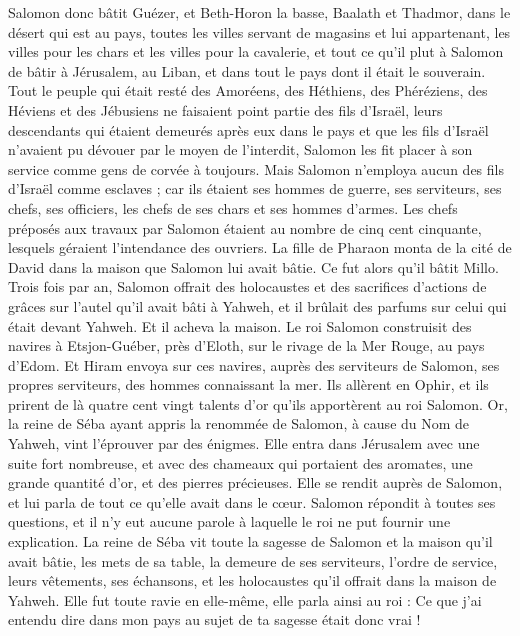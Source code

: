 \begin{multicols}{2}
Salomon donc bâtit Guézer, et Beth-Horon la basse,
Baalath et Thadmor, dans le désert qui est au pays,
toutes les villes servant de magasins et lui appartenant, les villes pour les chars et les villes pour la cavalerie, et tout ce qu’il plut à Salomon de bâtir à Jérusalem, au Liban, et dans tout le pays dont il était le souverain.
Tout le peuple qui était resté des Amoréens, des Héthiens, des Phéréziens, des Héviens et des Jébusiens ne faisaient point partie des fils d'Israël,
leurs descendants qui étaient demeurés après eux dans le pays et que les fils d'Israël n'avaient pu dévouer par le moyen de l'interdit, Salomon les fit placer à son service comme gens de corvée à toujours.
Mais Salomon n’employa aucun des fils d'Israël comme esclaves ; car ils étaient ses hommes de guerre, ses serviteurs, ses chefs, ses officiers, les chefs de ses chars et ses hommes d'armes.
Les chefs préposés aux travaux par Salomon étaient au nombre de cinq cent cinquante, lesquels géraient l'intendance des ouvriers.
La fille de Pharaon monta de la cité de David dans la maison que Salomon lui avait bâtie. Ce fut alors qu’il bâtit Millo.
Trois fois par an, Salomon offrait des holocaustes et des sacrifices d’actions de grâces sur l'autel qu'il avait bâti à Yahweh, et il brûlait des parfums sur celui qui était devant Yahweh. Et il acheva la maison.
Le roi Salomon construisit des navires à Etsjon-Guéber, près d'Eloth, sur le rivage de la Mer Rouge, au pays d'Edom.
Et Hiram envoya sur ces navires, auprès des serviteurs de Salomon, ses propres serviteurs, des hommes connaissant la mer.
Ils allèrent en Ophir, et ils prirent de là quatre cent vingt talents d'or qu’ils apportèrent au roi Salomon.
\VerseOne{}Or, la reine de Séba ayant appris la renommée de Salomon, à cause du Nom de Yahweh, vint l’éprouver par des énigmes.
Elle entra dans Jérusalem avec une suite fort nombreuse, et avec des chameaux qui portaient des aromates, une grande quantité d'or, et des pierres précieuses. Elle se rendit auprès de Salomon, et lui parla de tout ce qu'elle avait dans le cœur.
Salomon répondit à toutes ses questions, et il n’y eut aucune parole à laquelle le roi ne put fournir une explication.
La reine de Séba vit toute la sagesse de Salomon et la maison qu'il avait bâtie,
les mets de sa table, la demeure de ses serviteurs, l’ordre de service, leurs vêtements, ses échansons, et les holocaustes qu'il offrait dans la maison de Yahweh.
Elle fut toute ravie en elle-même, elle parla ainsi au roi : Ce que j'ai entendu dire dans mon pays au sujet de ta sagesse était donc vrai !

\end{multicols}
